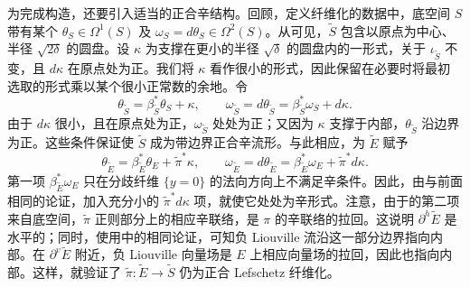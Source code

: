 为完成构造，还要引入适当的正合辛结构。回顾，定义纤维化的数据中，底空间 $S$ 带有某个 $\theta_S\in\Omega^1(S)$ 及 $\omega_S=d\theta_S\in\Omega^2(S)$。从可见，$\widetilde S$ 包含以原点为中心、半径 $\sqrt{2\delta}$ 的圆盘。设 $\kappa$ 为支撑在更小的半径 $\sqrt\delta$ 的圆盘内的一形式，关于 $\iota_{\widetilde S}$ 不变，且 $d\kappa$ 在原点处为正。我们将 $\kappa$ 看作很小的形式，因此保留在必要时将最初选取的形式乘以某个很小正常数的余地。令
\begin{equation}\label{eq:18.2}
\theta_{\widetilde S}=\beta_{\widetilde S}^*\theta_S+\kappa,\qquad
\omega_{\widetilde S}=d\theta_{\widetilde S}=\beta_{\widetilde S}^*\omega_S+d\kappa.
\end{equation}
由于 $d\kappa$ 很小，且在原点处为正，$\omega_{\widetilde S}$ 处处为正；又因为 $\kappa$ 支撑于内部，$\theta_{\widetilde S}$ 沿边界为正。这些条件保证使 $\widetilde S$ 成为带边界正合辛流形。与此相应，为 $\widetilde E$ 赋予
\begin{equation}\label{eq:18.3}
\theta_{\widetilde E}=\beta_{\widetilde E}^*\theta_E+\widetilde\pi^*\kappa,\qquad
\omega_{\widetilde E}=d\theta_{\widetilde E}=\beta_{\widetilde E}^*\omega_E+\widetilde\pi^*d\kappa.
\end{equation}
第一项 $\beta_{\widetilde E}^*\omega_E$ 只在分歧纤维 $\{y=0\}$ 的法向方向上不满足辛条件。因此，由与前面相同的论证，加入充分小的 $\widetilde\pi^*d\kappa$ 项，就使它处处为辛形式。注意，由于的第二项来自底空间，$\widetilde\pi$ 正则部分上的相应辛联络，是 $\pi$ 的辛联络的拉回。这说明 $\partial^h\widetilde E$ 是水平的；同时，使用中的相同论证，可知负 Liouville 流沿这一部分边界指向内部。在 $\partial^v\widetilde E$ 附近，负 Liouville 向量场是
$E$ 上相应向量场的拉回，因此也指向内部。这样，就验证了 $\widetilde\pi:\widetilde E\to\widetilde S$ 仍为正合 Lefschetz 纤维化。

